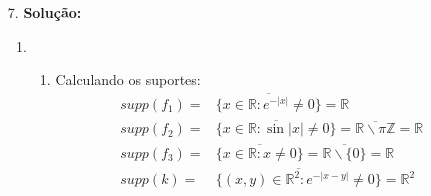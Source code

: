 \documentclass{article}
\begin{document}
\begin{enumerate}
		\item[7.] \textbf{Solução:} 
			\begin{enumerate}
				\item 
				\begin{enumerate}
					\item Calculando os suportes:
					$$
					\begin{aligned}
					supp(f_{1}) = & \overline{ \{x \in \mathbb{R}: e^{-|x|} \neq 0\} } = \mathbb{R} \\ 
					supp(f_{2}) = & \overline{ \{x \in \mathbb{R}: \sin{|x|} \neq 0\} } = \overline{\mathbb{R} \backslash \pi \mathbb{Z} } = \mathbb{R}\\ 
					supp(f_{3}) = & \overline{ \{x \in \mathbb{R}: x \neq 0\} } = \overline{ \mathbb{R}\backslash \{0\} } = \mathbb{R} \\
					supp(k) = & \overline{ \{(x,y) \in \mathbb{R}^{2}: e^{-|x-y|} \neq 0\} } = \mathbb{R}^{2}
					\end{aligned}
					$$
					

\end{enumerate}
\end{enumerate}
\end{enumerate}
\end{document}
